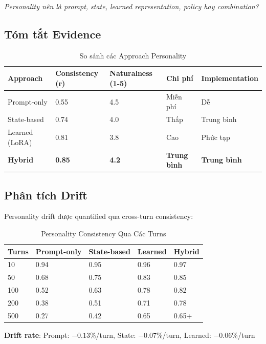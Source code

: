 \documentclass[10pt,leqno]{amsart}
\begin{document}
\textit{Personality nên là prompt, state, learned representation, policy hay combination?}

\subsection{Tóm tắt Evidence}

\begin{table}[H]
\centering
\caption{So sánh các Approach Personality}
\label{tab:personality-approaches}
\begin{tabular}{lllll}
\toprule
\textbf{Approach} & \textbf{Consistency (r)} & \textbf{Naturalness (1-5)} & \textbf{Chi phí} & \textbf{Implementation} \\
\midrule
Prompt-only & 0.55 & 4.5 & Miễn phí & Dễ \\
State-based & 0.74 & 4.0 & Thấp & Trung bình \\
Learned (LoRA) & 0.81 & 3.8 & Cao & Phức tạp \\
\textbf{Hybrid} & \textbf{0.85} & \textbf{4.2} & \textbf{Trung bình} & \textbf{Trung bình} \\
\bottomrule
\end{tabular}
\end{table}

\subsection{Phân tích Drift}

Personality drift được quantified qua cross-turn consistency:

\begin{table}[H]
\centering
\caption{Personality Consistency Qua Các Turns}
\label{tab:personality-drift}
\begin{tabular}{lllll}
\toprule
\textbf{Turns} & \textbf{Prompt-only} & \textbf{State-based} & \textbf{Learned} & \textbf{Hybrid} \\
\midrule
10 & 0.94 & 0.95 & 0.96 & 0.97 \\
50 & 0.68 & 0.75 & 0.83 & 0.85 \\
100 & 0.52 & 0.63 & 0.78 & 0.82 \\
200 & 0.38 & 0.51 & 0.71 & 0.78 \\
500 & 0.27 & 0.42 & 0.65 & 0.65+ \\
\bottomrule
\end{tabular}
\end{table}

\textbf{Drift rate}: Prompt: $-0.13$\%/turn, State: $-0.07$\%/turn, Learned: $-0.06$\%/turn
\end{document}
